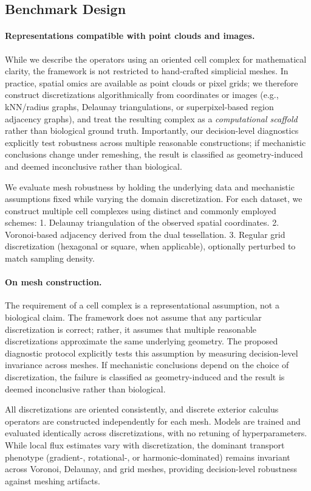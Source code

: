 \documentclass[10pt,article]{article}
\begin{document}
\subsection{Benchmark Design}

\paragraph{Representations compatible with point clouds and images.}
While we describe the operators using an oriented cell complex for mathematical clarity, the framework is not restricted to hand-crafted simplicial meshes. In practice, spatial omics are available as point clouds or pixel grids; we therefore construct discretizations algorithmically from coordinates or images (e.g., kNN/radius graphs, Delaunay triangulations, or superpixel-based region adjacency graphs), and treat the resulting complex as a \emph{computational scaffold} rather than biological ground truth. Importantly, our decision-level diagnostics explicitly test robustness across multiple reasonable constructions; if mechanistic conclusions change under remeshing, the result is classified as geometry-induced and deemed inconclusive rather than biological.

We evaluate mesh robustness by holding the underlying data and mechanistic assumptions fixed while varying the domain discretization. For each dataset, we construct multiple cell complexes using distinct and commonly employed schemes:
	1.	Delaunay triangulation of the observed spatial coordinates.
	2.	Voronoi-based adjacency derived from the dual tessellation.
	3.	Regular grid discretization (hexagonal or square, when applicable), optionally perturbed to match sampling density.

\paragraph{On mesh construction.}
The requirement of a cell complex is a representational assumption, not a biological claim. The framework does not assume that any particular discretization is correct; rather, it assumes that multiple reasonable discretizations approximate the same underlying geometry. The proposed diagnostic protocol explicitly tests this assumption by measuring decision-level invariance across meshes. If mechanistic conclusions depend on the choice of discretization, the failure is classified as geometry-induced and the result is deemed inconclusive rather than biological.

All discretizations are oriented consistently, and discrete exterior calculus operators are constructed independently for each mesh. Models are trained and evaluated identically across discretizations, with no retuning of hyperparameters.
While local flux estimates vary with discretization, the dominant transport phenotype (gradient-, rotational-, or harmonic-dominated) remains invariant across Voronoi, Delaunay, and grid meshes, providing decision-level robustness against meshing artifacts.
\end{document}
